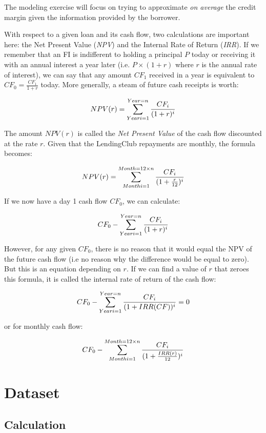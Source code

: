 \documentclass[11pt,]{report}
\begin{document}
The modeling exercise will focus on trying to approximate \emph{on average} the credit margin given the information provided by the borrower.

With respect to a given loan and its cash flow, two calculations are important here: the Net Present Value (\emph{NPV}) and the Internal Rate of Return (\emph{IRR}). If we remember that an FI is indifferent to holding a principal \(P\) today or receiving it with an annual interest a year later (i.e. \(P \times (1 + r)\) where \(r\) is the annual rate of interest), we can say that any amount \(CF_1\) received in a year is equivalent to \(CF_0 = \frac{CF_1}{1 + r}\) today. More generally, a steam of future cash receipts is worth:

\[NPV(r) = \sum_{Year \space i = 1}^{Year = n}\frac{CF_i}{(1 + r)^i}\]

The amount \(NPV(r)\) is called the \emph{Net Present Value} of the cash flow discounted at the rate \(r\). Given that the LendingClub repayments are monthly, the formula becomes:

\[NPV(r) = \sum_{Month \space i = 1}^{Month = 12 \times n}\frac{CF_i}{(1 + \frac{r}{12})^i}\]

If we now have a day 1 cash flow \(CF_0\), we can calculate:

\[CF_0 - \sum_{Year \space i = 1}^{Year = n}\frac{CF_i}{(1 + r)^i}\]

However, for any given \(CF_0\), there is no reason that it would equal the NPV of the future cash flow (i.e no reason why the difference would be equal to zero). But this is an equation depending on \(r\). If we can find a value of \(r\) that zeroes this formula, it is called the internal rate of return of the cash flow:

\[CF_0 - \sum_{Year \space i = 1}^{Year = n}\frac{CF_i}{(1 + IRR(CF))^i} = 0\]

or for monthly cash flow:

\[CF_0 - \sum_{Month \space i = 1}^{Month = 12 \times n}\frac{CF_i}{(1 + \frac{IRR(r)}{12})^i}\]

\hypertarget{dataset-1}{%
\section{Dataset}\label{dataset-1}}

\hypertarget{calculation}{%
\subsection{Calculation}\label{calculation}}
\end{document}
